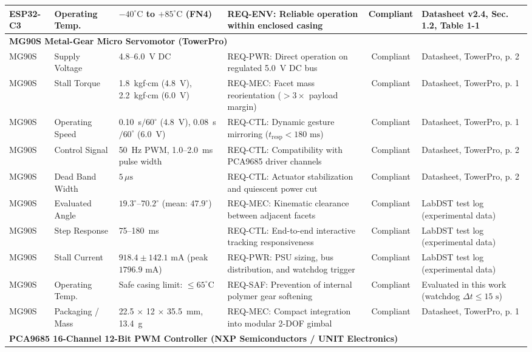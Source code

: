 \documentclass[lettersize,journal]{IEEEtran}
\begin{document}
\begin{table}[!t]
\begin{tabular}{p{2.2cm} p{2.8cm} p{3.0cm} p{3.8cm} c p{3.4cm}}
			ESP32-C3 & Operating Temp. & $-40^\circ\text{C}$ to $+85^\circ\text{C}$ (FN4) & REQ-ENV: Reliable operation within enclosed casing & Compliant & Datasheet v2.4, Sec. 1.2, Table 1-1 \\
			\midrule
			\multicolumn{6}{l}{\textbf{MG90S Metal-Gear Micro Servomotor (TowerPro)}} \\
			MG90S & Supply Voltage & 4.8--6.0~V DC & REQ-PWR: Direct operation on regulated 5.0~V DC bus & Compliant & Datasheet, TowerPro, p. 2 \\
			MG90S & Stall Torque & 1.8~kgf$\cdot$cm (4.8~V), 2.2~kgf$\cdot$cm (6.0~V) & REQ-MEC: Facet mass reorientation ($> 3\times$ payload margin) & Compliant & Datasheet, TowerPro, p. 1 \\
			MG90S & Operating Speed & 0.10~s$/60^\circ$ (4.8~V), 0.08~s$/60^\circ$ (6.0~V) & REQ-CTL: Dynamic gesture mirroring ($t_{\text{resp}} < 180\text{ ms}$) & Compliant & Datasheet, TowerPro, p. 1 \\
			MG90S & Control Signal & 50~Hz PWM, 1.0--2.0~ms pulse width & REQ-CTL: Compatibility with PCA9685 driver channels & Compliant & Datasheet, TowerPro, p. 2 \\
			MG90S & Dead Band Width & $5\,\mu\text{s}$ & REQ-CTL: Actuator stabilization and quiescent power cut & Compliant & Datasheet, TowerPro, p. 2 \\
			MG90S & Evaluated Angle & $19.3^\circ$--$70.2^\circ$ (mean: $47.9^\circ$) & REQ-MEC: Kinematic clearance between adjacent facets & Compliant & LabDST test log (experimental data) \\
			MG90S & Step Response & 75--180~ms & REQ-CTL: End-to-end interactive tracking responsiveness & Compliant & LabDST test log (experimental data) \\
			MG90S & Stall Current & $918.4 \pm 142.1\text{ mA}$ (peak $1796.9\text{ mA}$) & REQ-PWR: PSU sizing, bus distribution, and watchdog trigger & Compliant & LabDST test log (experimental data) \\
			MG90S & Operating Temp. & Safe casing limit: $\le 65^\circ\text{C}$ & REQ-SAF: Prevention of internal polymer gear softening & Compliant & Evaluated in this work (watchdog $\Delta t \le 15\text{ s}$) \\
			MG90S & Packaging / Mass & 22.5 $\times$ 12 $\times$ 35.5~mm, 13.4~g & REQ-MEC: Compact integration into modular 2-DOF gimbal & Compliant & Datasheet, TowerPro, p. 1 \\
			\midrule
			\multicolumn{6}{l}{\textbf{PCA9685 16-Channel 12-Bit PWM Controller (NXP Semiconductors / UNIT Electronics)}} \\

\end{tabular}
\end{table}
\end{document}

